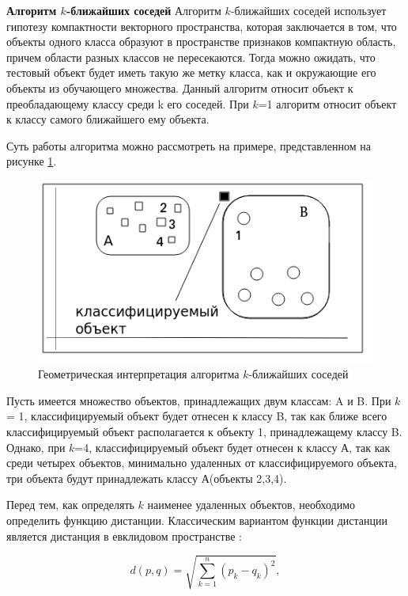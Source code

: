 \vspace{\baselineskip}
\textbf{Алгоритм $k$-ближайших соседей}
Алгоритм $k$-ближайших соседей использует гипотезу компактности векторного пространства, которая заключается в том, что объекты одного класса образуют в пространстве признаков компактную область, причем области разных классов не пересекаются. Тогда можно ожидать, что тестовый объект будет иметь такую же метку класса, как и окружающие его объекты из обучающего множества. Данный алгоритм относит объект к преобладающему классу среди k его соседей. При $k$=1 алгоритм относит объект к классу самого ближайшего ему объекта.

Суть работы алгоритма можно рассмотреть на примере, представленном на рисунке \ref{anal:k-neigbors}.

\begin{figure}[h!]
	\centering
	\includegraphics[width=\textwidth]{inc/img/k-neignbors.png}
	\caption{Геометрическая интерпретация алгоритма $k$-ближайших соседей}
	\label{anal:k-neigbors}
\end{figure}

Пусть имеется множество объектов, принадлежащих двум классам: A и B. При $k$ = 1, классифицируемый объект будет отнесен к классу B, так как ближе всего классифицируемый объект располагается к объекту 1, принадлежащему классу B.
Однако, при $k$=4, классифицируемый объект будет отнесен к классу А, так как среди четырех объектов, минимально удаленных от классифицируемого объекта, три объекта будут принадлежать классу А(объекты 2,3,4).

Перед тем, как определять $k$ наименее удаленных объектов, необходимо определить функцию дистанции. Классическим вариантом функции дистанции является дистанция в евклидовом пространстве \cite{distance}:

\begin{equation}
d(p,q) = \sqrt{\sum_{k=1}^{n}(p_k-q_k)^2},
\end{equation}

